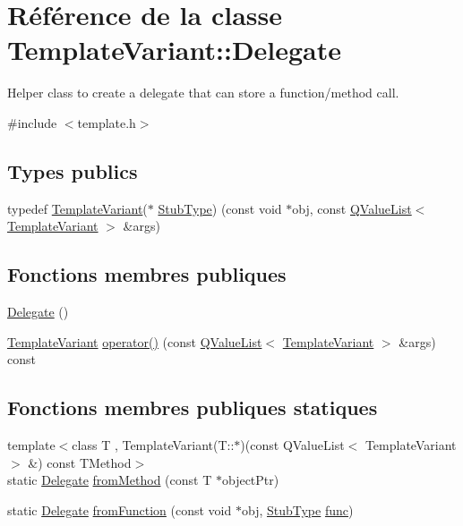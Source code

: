 \hypertarget{class_template_variant_1_1_delegate}{}\section{Référence de la classe Template\+Variant\+:\+:Delegate}
\label{class_template_variant_1_1_delegate}


Helper class to create a delegate that can store a function/method call.  




{\ttfamily \#include $<$template.\+h$>$}

\subsection*{Types publics}
\begin{DoxyCompactItemize}
\item 
typedef \hyperlink{class_template_variant}{Template\+Variant}($\ast$ \hyperlink{class_template_variant_1_1_delegate_ae02c3848db4a42a6bc88f81f5166923a}{Stub\+Type}) (const void $\ast$obj, const \hyperlink{class_q_value_list}{Q\+Value\+List}$<$ \hyperlink{class_template_variant}{Template\+Variant} $>$ \&args)
\end{DoxyCompactItemize}
\subsection*{Fonctions membres publiques}
\begin{DoxyCompactItemize}
\item 
\hyperlink{class_template_variant_1_1_delegate_a0c79ac8ba5b3adf918124449aed0db8d}{Delegate} ()
\item 
\hyperlink{class_template_variant}{Template\+Variant} \hyperlink{class_template_variant_1_1_delegate_a257d78d846735739620ab33918e7899f}{operator()} (const \hyperlink{class_q_value_list}{Q\+Value\+List}$<$ \hyperlink{class_template_variant}{Template\+Variant} $>$ \&args) const 
\end{DoxyCompactItemize}
\subsection*{Fonctions membres publiques statiques}
\begin{DoxyCompactItemize}
\item 
{\footnotesize template$<$class T , Template\+Variant(\+T\+::$\ast$)(const Q\+Value\+List$<$ Template\+Variant $>$ \&) const T\+Method$>$ }\\static \hyperlink{class_template_variant_1_1_delegate}{Delegate} \hyperlink{class_template_variant_1_1_delegate_a6a013222ab665507469657d09c07c92b}{from\+Method} (const T $\ast$object\+Ptr)
\item 
static \hyperlink{class_template_variant_1_1_delegate}{Delegate} \hyperlink{class_template_variant_1_1_delegate_a226f1f2e20f6d26fea2d989fd91bd8a8}{from\+Function} (const void $\ast$obj, \hyperlink{class_template_variant_1_1_delegate_ae02c3848db4a42a6bc88f81f5166923a}{Stub\+Type} \hyperlink{036__link_8c_affb6da6cff1b57cdf8efc0123dceac9b}{func})
\end{DoxyCompactItemize}


